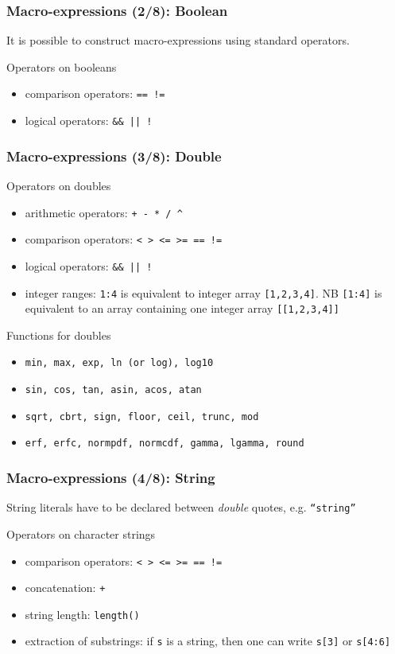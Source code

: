 \documentclass{beamer}
\begin{document}
\begin{frame}[fragile=singleslide]
  \frametitle{Macro-expressions (2/8): Boolean}
  It is possible to construct macro-expressions using standard operators.
  \begin{block}{Operators on booleans}
    \begin{itemize}
    \item comparison operators: \texttt{== !=}
    \item logical operators: \verb+&& || !+
    \end{itemize}
  \end{block}
\end{frame}

\begin{frame}[fragile=singleslide]
  \frametitle{Macro-expressions (3/8): Double}
  \begin{block}{Operators on doubles}
    \begin{itemize}
    \item arithmetic operators: \texttt{+ - * / \^{}}
    \item comparison operators: \texttt{< > <= >= == !=}
    \item logical operators: \verb+&& || !+
    \item integer ranges: \texttt{1:4} is equivalent to integer array \texttt{[1,2,3,4]}. NB  \texttt{[1:4]} is equivalent to an array containing one integer array \texttt{[[1,2,3,4]]}
    \end{itemize}
  \end{block}

  \begin{block}{Functions for doubles}
    \begin{itemize}
    \item \texttt{min, max, exp, ln (or log), log10}
    \item \texttt{sin, cos, tan, asin, acos, atan}
    \item \texttt{sqrt, cbrt, sign, floor, ceil, trunc, mod}
    \item \texttt{erf, erfc, normpdf, normcdf, gamma, lgamma, round}
    \end{itemize}
  \end{block}
\end{frame}

\begin{frame}[fragile=singleslide]
  \frametitle{Macro-expressions (4/8): String}
  String literals have to be declared between \textit{double} quotes, e.g. \texttt{``string''}
  \begin{block}{Operators on character strings}
    \begin{itemize}
    \item comparison operators: \texttt{< > <= >= == !=}
    \item concatenation: \texttt{+}
    \item string length: \texttt{length()}
    \item extraction of substrings: if \texttt{s} is a string, then one can write \texttt{s[3]} or \texttt{s[4:6]}
    \end{itemize}
  \end{block}
\end{frame}
\end{document}
